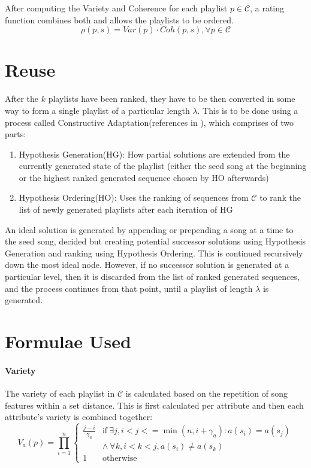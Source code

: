 \documentclass[a4paper, 12pt]{report}
\begin{document}
After computing the Variety and Coherence for each playlist \(p\in\mathcal{C}\), a rating function combines both and allows the playlists to be ordered.
\[\rho(p, s) = Var(p) \cdot Coh(p, s), \forall p \in \mathcal{C}\]

\section{Reuse}
After the \(k\) playlists have been ranked, they have to be then converted in some way to form a single playlist of a particular length \(\lambda\). 
This is to be done using a process called Constructive Adaptation(references \cite{constructive-adaptation} in \cite{main}), which comprises of two parts:
\begin{enumerate}
    \item Hypothesis Generation(HG): How partial solutions are extended from the currently generated state of the playlist 
    (either the seed song at the beginning or the highest ranked generated sequence chosen by HO afterwards)
    \item Hypothesis Ordering(HO): Uses the ranking of sequences from \(\mathcal{C}\) to rank the list of newly generated playlists after each iteration of HG
\end{enumerate}
An ideal solution is generated by appending or prepending a song at a time to the seed song, decided but creating potential successor 
solutions using Hypothesis Generation and ranking using Hypothesis Ordering. 
This is continued recursively down the most ideal node. However, if no successor solution is generated at a particular level, then it is discarded from the 
list of ranked generated sequences, and the process continues from that point, until a playlist of length \(\lambda\) is generated.

\section{Formulae Used}\cite[pp. 5--10]{main}
\paragraph{Variety}
The variety of each playlist in \(\mathcal{C}\) is calculated based on the repetition of song features within a set distance. 
This is first calculated per attribute and then each attribute's variety is combined together:
\begin{equation}
V_a(p) = \prod_{i=1}^n
\begin{cases}
    \frac{j-i}{\gamma_a} & \text{if}\ \exists j, i < j <= \min(n, i+\gamma_a) : a(s_i) = a(s_j) \\
    & \wedge\ \forall k, i < k < j, a(s_i) \neq a(s_k) \\
    1 & \text{otherwise}
\end{cases}
\end{equation}
\end{document}
